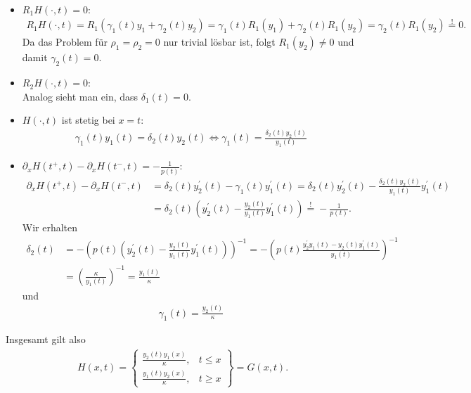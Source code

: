 \begin{solution}
\begin{itemize}
\begin{align*}
  \end{align*}
  \item $R_1H(\cdot,t) = 0$:
  \begin{align*}
    R_1H(\cdot,t) = R_1(\gamma_1(t)y_1 + \gamma_2(t)y_2)
    = \gamma_1(t)R_1(y_1) + \gamma_2(t)R_1(y_2) = \gamma_2(t)R_1(y_2) \stackrel{!}{=} 0.
  \end{align*}
  Da das Problem für $\rho_1 = \rho_2 = 0$ nur trivial lösbar ist, folgt $R_1(y_2) \neq 0$
  und damit $\gamma_2(t) = 0$.
  \item $R_2H(\cdot,t) = 0$: \\
  Analog sieht man ein, dass $\delta_1(t) = 0$.
  \item $H(\cdot,t)$ ist stetig bei $x = t$:
  \begin{align*}
    \gamma_1(t)y_1(t) = \delta_2(t)y_2(t)
    \iff
    \gamma_1(t) = \frac{\delta_2(t)y_2(t)}{y_1(t)}
  \end{align*}
  \item $\partial_x H(t^+,t)- \partial_x H(t^-,t) = - \frac{1}{p(t)}$:
  \begin{align*}
    \partial_x H(t^+,t) - \partial_x H(t^-,t) &= \delta_2(t)y_2^{\prime}(t)- \gamma_1(t)y_1^{\prime}(t)
    = \delta_2(t)y_2^{\prime}(t)- \frac{\delta_2(t)y_2(t)}{y_1(t)}y_1^{\prime}(t) \\
    &= \delta_2(t)\left(y_2^{\prime}(t)-  \frac{y_2(t)}{y_1(t)}y_1^{\prime}(t)\right)
    \stackrel{!}{=} -\frac{1}{p(t)}.
  \end{align*}
  Wir erhalten
  \begin{align*}
    \delta_2(t) &= -\left(p(t)\left(y_2^{\prime}(t)-  \frac{y_2(t)}{y_1(t)}y_1^{\prime}(t)\right)\right)^{-1}
    = -\left(p(t)\frac{y_2^{\prime}y_1(t) - y_2(t)y_1^{\prime}(t)}{y_1(t)}\right)^{-1} \\
    &= \left(\frac{\kappa}{y_1(t)}\right)^{-1} = \frac{y_1(t)}{\kappa}
  \end{align*}
  und
  \begin{align*}
    \gamma_1(t) = \frac{y_2(t)}{\kappa}
  \end{align*}
\end{itemize}
Insgesamt gilt also
\begin{align*}
  H(x,t) = \begin{Bmatrix}
    \frac{y_2(t)y_1(x)}{\kappa}, & t \leq x \\
    \frac{y_1(t)y_2(x)}{\kappa}, & t \geq x
  \end{Bmatrix} = G(x,t).
\end{align*}
\end{solution}
